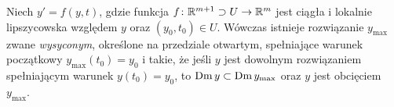 \begin{theorem}
  Niech $y' = f(y,t)$, gdzie funkcja $f \colon \mathbb{R}^{m+1} \supset U \to \mathbb{R}^m$ jest ciągła i lokalnie
  lipszycowska względem $y$ oraz $(y_0, t_0) \in U$. Wówczas istnieje rozwiązanie $y_{\mathrm{max}}$ zwane
  \emph{wysyconym}, określone na przedziale otwartym, spełniające warunek początkowy $y_{\mathrm{max}}(t_0)
  = y_0$ i takie, że jeśli $y$ jest dowolnym rozwiązaniem spełniającym warunek $y(t_0) = y_0$, to
  $\operatorname{Dm} y \subset \operatorname{Dm} y_{\mathrm{max}}$ oraz $y$ jest obcięciem $y_{\mathrm{max}}$.
\end{theorem}